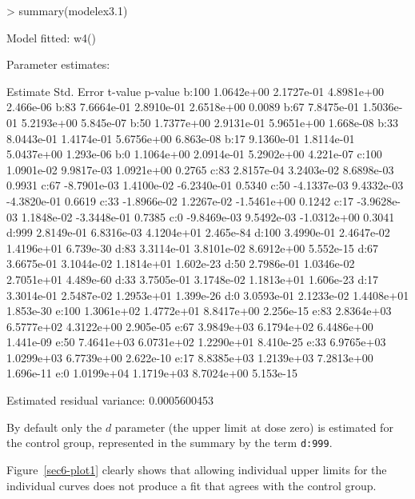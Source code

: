 \documentclass[a4paper]{article}
\begin{document}
\begin{Schunk}
\begin{Sinput}
> summary(modelex3.1)
\end{Sinput}
\begin{Soutput}
Model fitted: w4()

Parameter estimates:

         Estimate  Std. Error     t-value   p-value
b:100  1.0642e+00  2.1727e-01  4.8981e+00 2.466e-06
b:83   7.6664e-01  2.8910e-01  2.6518e+00    0.0089
b:67   7.8475e-01  1.5036e-01  5.2193e+00 5.845e-07
b:50   1.7377e+00  2.9131e-01  5.9651e+00 1.668e-08
b:33   8.0443e-01  1.4174e-01  5.6756e+00 6.863e-08
b:17   9.1360e-01  1.8114e-01  5.0437e+00 1.293e-06
b:0    1.1064e+00  2.0914e-01  5.2902e+00 4.221e-07
c:100  1.0901e-02  9.9817e-03  1.0921e+00    0.2765
c:83   2.8157e-04  3.2403e-02  8.6898e-03    0.9931
c:67  -8.7901e-03  1.4100e-02 -6.2340e-01    0.5340
c:50  -4.1337e-03  9.4332e-03 -4.3820e-01    0.6619
c:33  -1.8966e-02  1.2267e-02 -1.5461e+00    0.1242
c:17  -3.9628e-03  1.1848e-02 -3.3448e-01    0.7385
c:0   -9.8469e-03  9.5492e-03 -1.0312e+00    0.3041
d:999  2.8149e-01  6.8316e-03  4.1204e+01 2.465e-84
d:100  3.4990e-01  2.4647e-02  1.4196e+01 6.739e-30
d:83   3.3114e-01  3.8101e-02  8.6912e+00 5.552e-15
d:67   3.6675e-01  3.1044e-02  1.1814e+01 1.602e-23
d:50   2.7986e-01  1.0346e-02  2.7051e+01 4.489e-60
d:33   3.7505e-01  3.1748e-02  1.1813e+01 1.606e-23
d:17   3.3014e-01  2.5487e-02  1.2953e+01 1.399e-26
d:0    3.0593e-01  2.1233e-02  1.4408e+01 1.853e-30
e:100  1.3061e+02  1.4772e+01  8.8417e+00 2.256e-15
e:83   2.8364e+03  6.5777e+02  4.3122e+00 2.905e-05
e:67   3.9849e+03  6.1794e+02  6.4486e+00 1.441e-09
e:50   7.4641e+03  6.0731e+02  1.2290e+01 8.410e-25
e:33   6.9765e+03  1.0299e+03  6.7739e+00 2.622e-10
e:17   8.8385e+03  1.2139e+03  7.2813e+00 1.696e-11
e:0    1.0199e+04  1.1719e+03  8.7024e+00 5.153e-15

Estimated residual variance: 0.0005600453 
\end{Soutput}
\end{Schunk}
By default only the $d$ parameter (the upper limit at dose zero) is estimated for the control group, represented in the summary by the term \verb+d:999+.

Figure~\ref{sec6-plot1} clearly shows that allowing individual upper limits for the individual curves does not produce a fit that agrees with the
control group.
\end{document}
